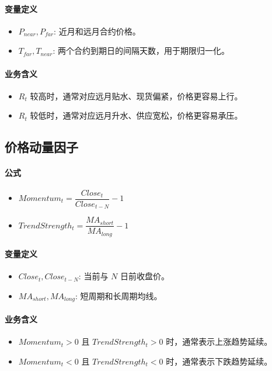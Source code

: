 \documentclass[11pt,a4paper]{ctexart}
\begin{document}
\paragraph{变量定义}
\begin{itemize}
\item $P_{near}, P_{far}$: 近月和远月合约价格。
\item $T_{far}, T_{near}$: 两个合约到期日的间隔天数，用于期限归一化。
\end{itemize}
\paragraph{业务含义}
\begin{itemize}
\item $R_t$ 较高时，通常对应远月贴水、现货偏紧，价格更容易上行。
\item $R_t$ 较低时，通常对应远月升水、供应宽松，价格更容易承压。
\end{itemize}
\subsection{价格动量因子}
\paragraph{公式}
\begin{itemize}
\item $Momentum_t=\dfrac{Close_t}{Close_{t-N}}-1$
\item $TrendStrength_t=\dfrac{MA_{short}}{MA_{long}}-1$
\end{itemize}
\paragraph{变量定义}
\begin{itemize}
\item $Close_t, Close_{t-N}$: 当前与 $N$ 日前收盘价。
\item $MA_{short}, MA_{long}$: 短周期和长周期均线。
\end{itemize}
\paragraph{业务含义}
\begin{itemize}
\item $Momentum_t>0$ 且 $TrendStrength_t>0$ 时，通常表示上涨趋势延续。
\item $Momentum_t<0$ 且 $TrendStrength_t<0$ 时，通常表示下跌趋势延续。
\end{itemize}
\end{document}
